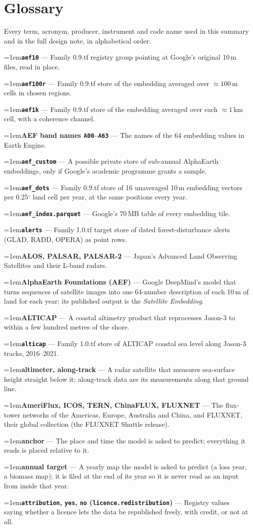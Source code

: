 \documentclass[10pt]{article}
\newcommand{\code}[1]{\texttt{#1}}
\newcommand{\gl}[2]{\par\hangindent=1em\hangafter=1\textbf{#1} --- #2\par}
\begin{document}
\clearpage
{}\label{glossary}
\section*{Glossary}
Every term, acronym, producer, instrument and code name used in this summary and in the full design note, in alphabetical order.
\small
\gl{\code{aef10}}{Family 0.9.tf registry group pointing at Google's original 10\,m files, read in place.}
\gl{\code{aef100r}}{Family 0.9.tf store of the embedding averaged over $\approx 100$\,m cells in chosen regions.}
\gl{\code{aef1k}}{Family 0.9.tf store of the embedding averaged over each $\approx 1$\,km cell, with a coherence channel.}
\gl{AEF band names \code{A00}--\code{A63}}{The names of the 64 embedding values in Earth Engine.}
\gl{\code{aef\_custom}}{A possible private store of sub-annual AlphaEarth embeddings, only if Google's academic programme grants a sample.}
\gl{\code{aef\_dots}}{Family 0.9.tf store of 16 unaveraged 10\,m embedding vectors per 0.25$^\circ$ land cell per year, at the same positions every year.}
\gl{\code{aef\_index.parquet}}{Google's 70\,MB table of every embedding tile.}
\gl{\code{alerts}}{Family 1.0.tf target store of dated forest-disturbance alerts (GLAD, RADD, OPERA) as point rows.}
\gl{ALOS, PALSAR, PALSAR-2}{Japan's Advanced Land Observing Satellites and their L-band radars.}
\gl{AlphaEarth Foundations (AEF)}{Google DeepMind's model that turns sequences of satellite images into one 64-number description of each 10\,m of land for each year; its published output is the \emph{Satellite Embedding}.}
\gl{ALTICAP}{A coastal altimetry product that reprocesses Jason-3 to within a few hundred metres of the shore.}
\gl{\code{alticap}}{Family 1.0.tf store of ALTICAP coastal sea level along Jason-3 tracks, 2016--2021.}
\gl{altimeter, along-track}{A radar satellite that measures sea-surface height straight below it; along-track data are its measurements along that ground line.}
\gl{AmeriFlux, ICOS, TERN, ChinaFLUX, FLUXNET}{The flux-tower networks of the Americas, Europe, Australia and China, and FLUXNET, their global collection (the FLUXNET Shuttle release).}
\gl{anchor}{The place and time the model is asked to predict; everything it reads is placed relative to it.}
\gl{annual target}{A yearly map the model is asked to predict (a loss year, a biomass map); it is filed at the end of its year so it is never read as an input from inside that year.}
\gl{\code{attribution}, \code{yes}, \code{no} (\code{licence.redistribution})}{Registry values saying whether a licence lets the data be republished freely, with credit, or not at all.}
\end{document}
